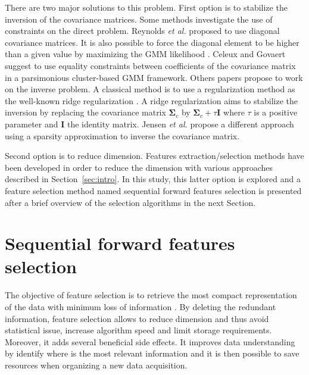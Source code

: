 \documentclass[journal,peerreview,onecolumn]{IEEEtran}
\begin{document}
    There are two major solutions to this problem. First option is to stabilize the inversion of the covariance matrices. Some methods investigate the use of constraints on the direct problem. Reynolds \emph{et al.} \cite{reynolds1995robust} proposed to use diagonal covariance matrices. It is also possible to force the diagonal element to be higher than a given value by maximizing the GMM likelihood \cite{hathaway1985constrained}. Celeux and Govaert \cite{celeux1995gaussian} suggest to use equality constraints between coefficients of the covariance matrix in a parsimonious cluster-based GMM framework. Others papers propose to work on the inverse problem. A classical method is to use a regularization method as the well-known ridge regularization \cite{hoerl1970ridge}. A ridge regularization aims to stabilize the inversion by replacing the covariance matrix $\boldsymbol{\Sigma}_c$ by $\boldsymbol{\Sigma}_c + \tau \mathbf{I}$ where $\tau$ is a positive parameter and $\mathbf{I}$ the identity matrix. Jensen \emph{et al.} \cite{jensen2008regression} propose a different approach using a sparsity approximation to inverse the covariance matrix.

    Second option is to reduce dimension. Features extraction/selection methods have been developed in order to reduce the dimension with various approaches described in Section~\ref{sec:intro}. In this study, this latter option is explored and a feature selection method named sequential forward features selection is presented after a brief overview of the selection algorithms in the next Section.

\section{Sequential forward features selection}
\label{sec:selection}

The objective of feature selection is to retrieve the most compact representation of the data with minimum loss of information \cite{Guyon:2006:FEF:1208773}. By deleting the redundant information, feature selection allows to reduce dimension and thus avoid statistical issue, increase algorithm speed and limit storage requirements. Moreover, it adds several beneficial side effects. It improves data understanding by identify where is the most relevant information and it is then possible to save resources when organizing a new data acquisition.%
\end{document}
